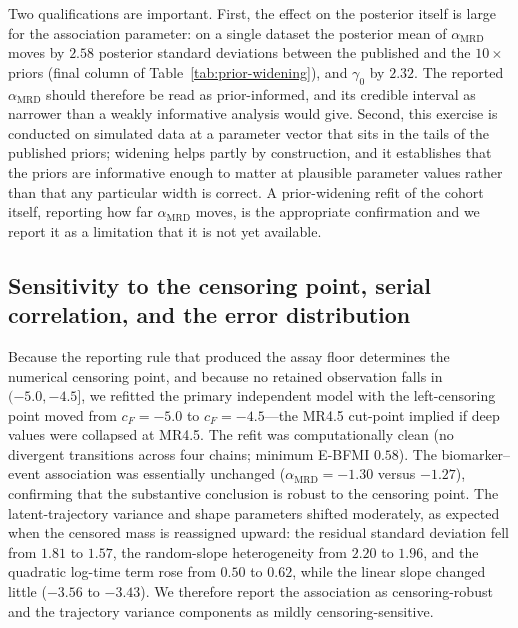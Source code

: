 \documentclass[11pt]{article}
\begin{document}
Two qualifications are important. First, the effect on the posterior itself is
large for the association parameter: on a single dataset the posterior mean of
$\alpha_{\mathrm{MRD}}$ moves by $2.58$ posterior standard deviations between
the published and the $10\times$ priors (final column of
Table~\ref{tab:prior-widening}), and $\gamma_0$ by $2.32$. The reported
$\alpha_{\mathrm{MRD}}$ should therefore be read as prior-informed, and its
credible interval as narrower than a weakly informative analysis would give.
Second, this exercise is conducted on simulated data at a parameter vector that
sits in the tails of the published priors; widening helps partly by
construction, and it establishes that the priors are informative enough to
matter at plausible parameter values rather than that any particular width is
correct. A prior-widening refit of the cohort itself, reporting how far
$\alpha_{\mathrm{MRD}}$ moves, is the appropriate confirmation and we report it
as a limitation that it is not yet available.



\subsection{Sensitivity to the censoring point, serial correlation, and the
error distribution}
\label{sec:sens-extra}

Because the reporting rule that produced the assay floor determines the numerical
censoring point, and because no retained observation falls in $(-5.0,-4.5]$, we
refitted the primary independent model with the left-censoring point moved from
$c_F=-5.0$ to $c_F=-4.5$---the MR4.5 cut-point implied if deep values were collapsed
at MR4.5. The refit was computationally clean (no divergent transitions across four
chains; minimum E-BFMI $0.58$). The biomarker--event association was essentially
unchanged ($\alpha_{\mathrm{MRD}}=-1.30$ versus $-1.27$), confirming that the
substantive conclusion is robust to the censoring point. The latent-trajectory
variance and shape parameters shifted moderately, as expected when the censored
mass is reassigned upward: the residual standard deviation fell from $1.81$ to
$1.57$, the random-slope heterogeneity from $2.20$ to $1.96$, and the quadratic
log-time term rose from $0.50$ to $0.62$, while the linear slope changed little
($-3.56$ to $-3.43$). We therefore report the association as censoring-robust and
the trajectory variance components as mildly censoring-sensitive.
\end{document}

